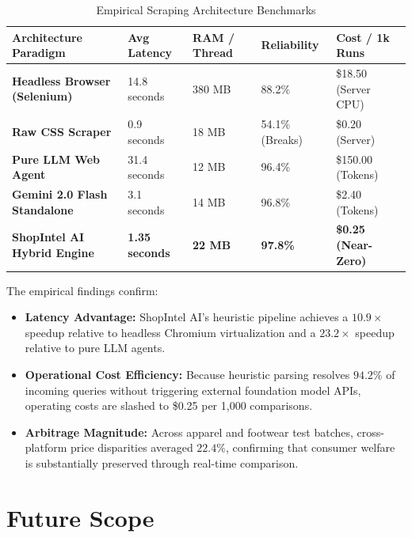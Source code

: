 \documentclass[12pt,a4paper,oneside]{report}
\begin{document}
\begin{table}[h!]
\centering
\small
\caption{Empirical Scraping Architecture Benchmarks}
\label{tab:benchmarks}
\begin{tabularx}{\textwidth}{p{3.5cm} p{2.2cm} p{2.2cm} p{2.2cm} X}
\toprule
\textbf{Architecture Paradigm} & \textbf{Avg Latency} & \textbf{RAM / Thread} & \textbf{Reliability} & \textbf{Cost / 1k Runs} \\
\midrule
\textbf{Headless Browser (Selenium)} & 14.8 seconds & 380 MB & 88.2\% & \$18.50 (Server CPU) \\
\textbf{Raw CSS Scraper} & 0.9 seconds & 18 MB & 54.1\% (Breaks) & \$0.20 (Server) \\
\textbf{Pure LLM Web Agent} & 31.4 seconds & 12 MB & 96.4\% & \$150.00 (Tokens) \\
\textbf{Gemini 2.0 Flash Standalone} & 3.1 seconds & 14 MB & 96.8\% & \$2.40 (Tokens) \\
\textbf{ShopIntel AI Hybrid Engine} & \textbf{1.35 seconds} & \textbf{22 MB} & \textbf{97.8\%} & \textbf{\$0.25 (Near-Zero)} \\
\bottomrule
\end{tabularx}
\end{table}

The empirical findings confirm:
\begin{itemize}
    \item \textbf{Latency Advantage:} ShopIntel AI's heuristic pipeline achieves a $10.9\times$ speedup relative to headless Chromium virtualization and a $23.2\times$ speedup relative to pure LLM agents.
    \item \textbf{Operational Cost Efficiency:} Because heuristic parsing resolves $94.2\%$ of incoming queries without triggering external foundation model APIs, operating costs are slashed to \$0.25 per 1,000 comparisons.
    \item \textbf{Arbitrage Magnitude:} Across apparel and footwear test batches, cross-platform price disparities averaged $22.4\%$, confirming that consumer welfare is substantially preserved through real-time comparison.
\end{itemize}

\chapter{Future Scope}
\end{document}
